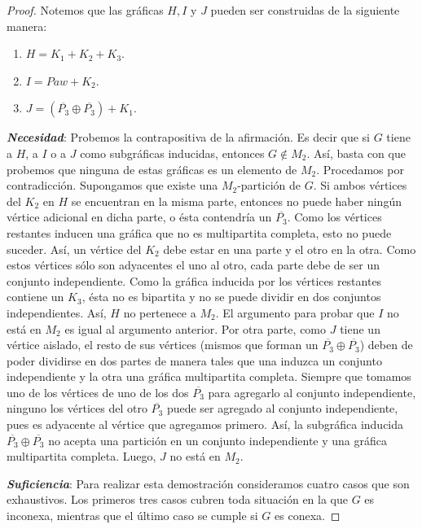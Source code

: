 \begin{proof}

    Notemos que las gráficas $H, I$ y $J$ pueden ser construidas de la siguiente manera:

    \begin{enumerate}[(1)]
        \item $H = K_1 + K_2 + K_3$.
        \item $I = Paw + K_2$.
        \item $J = (\overline{P_3} \oplus \overline{P_3}) + K_1$.
    \end{enumerate}

    \textbf{\emph{Necesidad}}: Probemos la contrapositiva de la afirmación. Es
    decir que si $G$ tiene a $H$, a $I$ o a $J$ como subgráficas inducidas,
    entonces $G\notin M_2$. Así, basta con que probemos que ninguna de estas
    gráficas es un elemento de $M_2$. Procedamos por contradicción. Supongamos
    que existe una $M_2$-partición de $G$. Si ambos vértices del $K_2$ en $H$
    se encuentran en la misma parte, entonces no puede haber ningún vértice
    adicional en dicha parte, o ésta contendría un $\overline{P_3}$. Como los
    vértices restantes inducen una gráfica que no es multipartita completa,
    esto no puede suceder. Así, un vértice del $K_2$ debe estar en una parte y
    el otro en la otra. Como estos vértices sólo son adyacentes el uno al otro,
    cada parte debe de ser un conjunto independiente. Como la gráfica inducida
    por los vértices restantes contiene un $K_3$, ésta no es bipartita y no se
    puede dividir en dos conjuntos independientes. Así, $H$ no pertenece a
    $M_2$. El argumento para probar que $I$ no está en $M_2$ es igual al
    argumento anterior. Por otra parte, como $J$ tiene un vértice aislado, el
    resto de sus vértices (mismos que forman un $\overline{P_3} \oplus
    \overline{P_3}$) deben de poder dividirse en dos partes de manera tales que
    una induzca un conjunto independiente y la otra una gráfica multipartita
    completa. Siempre que tomamos uno de los vértices de uno de los dos
    $\overline{P_3}$ para agregarlo al conjunto independiente, ninguno los
    vértices del otro $\overline{P_3}$ puede ser agregado al conjunto
    independiente, pues es adyacente al vértice que agregamos primero. Así, la
    subgráfica inducida $\overline{P_3} \oplus \overline{P_3}$ no acepta una
    partición en un conjunto independiente y una gráfica multipartita completa.
    Luego, $J$ no está en $M_2$.

    \textbf{\emph{Suficiencia}}: Para realizar esta demostración consideramos
    cuatro casos que son exhaustivos. Los primeros tres casos cubren toda
    situación en la que $G$ es inconexa, mientras que el último caso se cumple
    si $G$ es conexa.


\end{proof}
